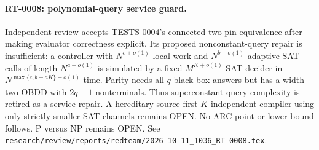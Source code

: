 \paragraph{RT-0008: polynomial-query service guard.}
Independent review accepts TESTS-0004's connected two-pin equivalence after
making evaluator correctness explicit.  Its proposed nonconstant-query repair
is insufficient: a controller with $N^{c+o(1)}$ local work and
$N^{b+o(1)}$ adaptive SAT calls of length $N^{a+o(1)}$ is simulated by a
fixed $M^{K+o(1)}$ SAT decider in
$N^{\max\{c,b+aK\}+o(1)}$ time.  Parity needs all $q$ black-box answers but
has a width-two OBDD with $2q-1$ nonterminals.  Thus superconstant query
complexity is retired as a service repair.  A hereditary source-first
$K$-independent compiler using only strictly smaller SAT channels remains
OPEN.  No ARC point or lower bound follows.  P versus NP remains OPEN.  See
\texttt{research/review/reports/redteam/2026-10-11\_1036\_RT-0008.tex}.
